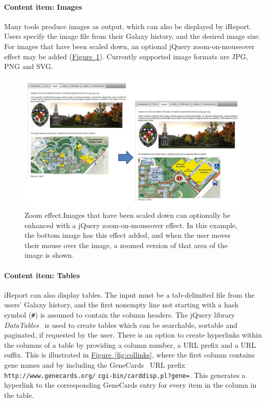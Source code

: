 \paragraph*{Content item: Images}
Many tools produce images as output, which can also be displayed by iReport. Users specify the image file from their Galaxy history, and the desired image size. For images that have been scaled down, an optional jQuery zoom-on-mouseover effect may be added (\hyperref[fig:imagezoom]{Figure~\ref*{fig:imagezoom}})\cite{url-jqueryzoom}. Currently supported image formats are JPG, PNG and SVG.

\begin{figure}[h!]
    \includegraphics[width=\textwidth]{chapters/images/iReport/Hiltemann_zoomeffect.jpg}
    \caption{Zoom effect.Images that have been scaled down can optionally be enhanced with a jQuery zoom-on-mouseover effect. In this example, the bottom image has this effect added, and when the user moves their mouse over the image, a zoomed version of that area of the image is shown.}
    \label{fig:imagezoom}
\end{figure}

\paragraph*{Content item: Tables}
iReport can also display tables. The input must be a tab-delimited file from the users' Galaxy history, and the first nonempty line not starting with a hash symbol (\verb+#+) is assumed to contain the column headers. The jQuery library \emph{DataTables}~\cite{url-datatables} is used to create tables which can be searchable, sortable and paginated, if requested by the user. There is an option to create hyperlinks within the columns of a table by providing a column number, a URL prefix and a URL suffix. This is illustrated in \hyperref[fig:collinks]{Figure~\ref*{fig:collinks}}, where the first column contains gene names and by including the GeneCards~\cite{genecardspaper,url-genecards} URL prefix \verb+http://www.genecards.org/+ \verb+cgi-bin/carddisp.pl?gene=+. This generates a hyperlink to the corresponding GeneCards entry for every item in the column in the table.

